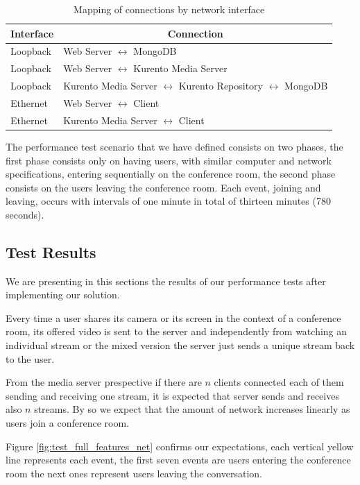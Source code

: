   \begin{table}[!htb]
\centering
\caption{Mapping of connections by network interface}
\label{table:interfacemap}
\begin{tabular}{|l|l|}
\hline
\multicolumn{1}{|c|}{\textbf{Interface}} & \multicolumn{1}{c|}{\textbf{Connection}}         \\ \hline
Loopback & Web Server $\leftrightarrow$ MongoDB  \\ \hline
Loopback & Web Server $\leftrightarrow$ Kurento Media Server  \\ \hline
Loopback & Kurento Media Server $\leftrightarrow$ Kurento Repository $\leftrightarrow$ MongoDB  \\ \hline
Ethernet & Web Server $\leftrightarrow$ Client\\ \hline
Ethernet & Kurento Media Server $\leftrightarrow$ Client\\ \hline
\end{tabular}
\end{table}


      The performance test scenario that we have defined consists on two phases, the first phase consists only on having users, with similar computer and network specifications, entering sequentially on the conference room, the second phase consists on the users leaving the conference room. Each event, joining and leaving, occurs with intervals of one minute in total of thirteen minutes (780 seconds).

  


\subsection{Test Results}
  
      We are presenting in this sections the results of our performance tests after implementing our solution.

      Every time a user shares its camera or its screen in the context of a conference room, its offered video is sent to the server and independently from watching an individual stream or the mixed version the server just sends a unique stream back to the user.

      From the media server prespective if there are $n$ clients connected each of them sending and receiving one stream, it is expected that server sends and receives also $n$ streams. By so we expect that the amount of network increases linearly as users join a conference room.

      Figure \ref{fig:test_full_features_net} confirms our expectations, each vertical yellow line represents each event, the first seven events are users entering the conference room the next ones represent users leaving the conversation. 
      


